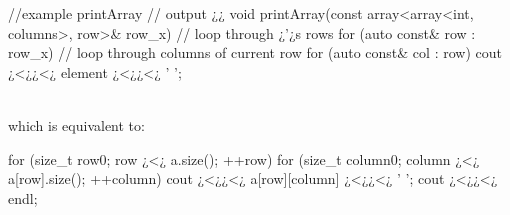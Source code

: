 \begin{minipage}{\MPWxLARGExLISTING\textwidth} %
{} %
\begin{CPPCode}
//example printArray
// output ¿¿
void printArray(const array<array<int, columns>, row>& row_x)
{
    // loop through ¿'¿s rows
    for (auto const& row : row_x)
    {
        // loop through columns of current row
        for (auto const& col : row)
        {
            cout ¿<¿¿<¿ element ¿<¿¿<¿ ' ';
        }
    }
}
\end{CPPCode}
\end{minipage}
\\
which is equivalent to:\\
\begin{minipage}{\MPWxLARGExLISTING\textwidth} %
{} %
\begin{CPPCode}
for (size_t row{0}; row ¿<¿ a.size(); ++row) 
{
    for (size_t column{0}; column ¿<¿ a[row].size(); ++column)
    {
        cout ¿<¿¿<¿ a[row][column] ¿<¿¿<¿ ' ';
    }
    cout ¿<¿¿<¿ endl;
}
\end{CPPCode}
\end{minipage}
\\



    


